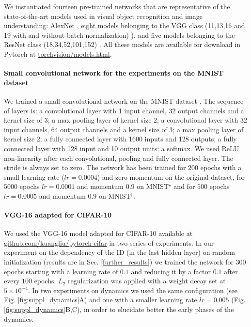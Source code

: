 \documentclass{article}
\begin{document}
We instantiated fourteen pre-trained networks that are representative of the state-of-the-art models used in visual object recognition and image understanding: AlexNet \cite{krizhevsky2012imagenet}, eight models belonging to the VGG class (11,13,16 and 19 with and without batch normalization) \cite{simonyan2014very}), and five models belonging to the ResNet class (18,34,52,101,152) \cite{He2015}. All these models are available for download in Pytorch \cite{paszke2017automatic} at \href{https://pytorch.org/docs/stable/torchvision/models.html}{torchvision/models.html}.

\paragraph{Small convolutional network for the experiments on the MNIST dataset}

We trained a small convolutional network on the MNIST dataset \cite{mnist}. The sequence of layers is: a convolutional layer with 1 input channel, 32 output channels and a kernel size of 3; a max pooling layer of kernel size 2; a convolutional layer with 32 input channels, 64 output channels and a kernel size of 3; a max pooling layer of kernel size 2; a fully connected layer with 1600 inputs and 128 outputs; a fully connected layer with 128 input and 10 output units; a  softmax. We used ReLU non-linearity after each convolutional, pooling and fully connected layer. The stride is always set to zero. The network has been trained for $200$ epochs with a small learning rate ($lr=0.0004$) and zero momentum on the original dataset, for $5000$ epochs $lr=0.0001$ and momentum $0.9$ on MNIST$^\star$ and for $500$ epochs $lr=0.0005$ and momentum $0.9$ on MNIST$^\dagger$.


\paragraph{VGG-16 adapted for CIFAR-10}

We used the VGG-16 model adapted for CIFAR-10 available at \href{https://github.com/kuangliu/pytorch-cifar}{github.com/kuangliu/pytorch-cifar} in two series of experiments. In our experiment on the dependency of the ID (in the last hidden layer) on random initialization (results are in Sec. \ref{further_results}) we trained the network for $300$ epochs starting with a learning rate of $0.1$ and reducing it by a factor $0.1$ after every $100$ epochs. $L_2$ regularization was applied with a weight decay set at $5\times 10^{-4}$. In two experiments on dynamics we used the same configuration (see Fig. \ref{fig:suppl_dynamics}A) and one with a smaller learning rate $lr=0.005$ (Fig. \ref{fig:suppl_dynamics}B,C), in order to elucidate better the early phases of the dynamics.
\end{document}
